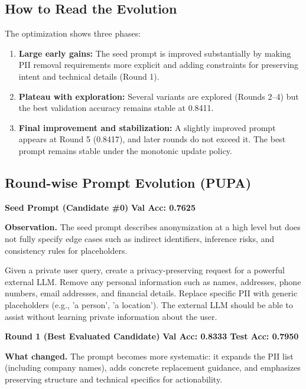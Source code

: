 \subsection{How to Read the Evolution}
The optimization shows three phases:
\begin{enumerate}
    \item \textbf{Large early gains:} The seed prompt is improved substantially by making PII removal requirements more explicit and adding constraints for preserving intent and technical details (Round 1).
    \item \textbf{Plateau with exploration:} Several variants are explored (Rounds 2--4) but the best validation accuracy remains stable at 0.8411.
    \item \textbf{Final improvement and stabilization:} A slightly improved prompt appears at Round 5 (0.8417), and later rounds do not exceed it. The best prompt remains stable under the monotonic update policy.
\end{enumerate}

\subsection{Round-wise Prompt Evolution (PUPA)}

\begin{roundbox}
\textbf{Seed Prompt (Candidate \#0)} \hfill \textbf{Val Acc: 0.7625}
\end{roundbox}

\noindent \textbf{Observation.} The seed prompt describes anonymization at a high level but does not fully specify edge cases such as indirect identifiers, inference risks, and consistency rules for placeholders.

\begin{prompttext}
Given a private user query, create a privacy-preserving request for a powerful external LLM. Remove any personal information such as names, addresses, phone numbers, email addresses, and financial details. Replace specific PII with generic placeholders (e.g., 'a person', 'a location'). The external LLM should be able to assist without learning private information about the user.
\end{prompttext}

\begin{roundbox}
\textbf{Round 1 (Best Evaluated Candidate)} \hfill \textbf{Val Acc: 0.8333 \;\; Test Acc: 0.7950}
\end{roundbox}

\noindent \textbf{What changed.} The prompt becomes more systematic: it expands the PII list (including company names), adds concrete replacement guidance, and emphasizes preserving structure and technical specifics for actionability.

